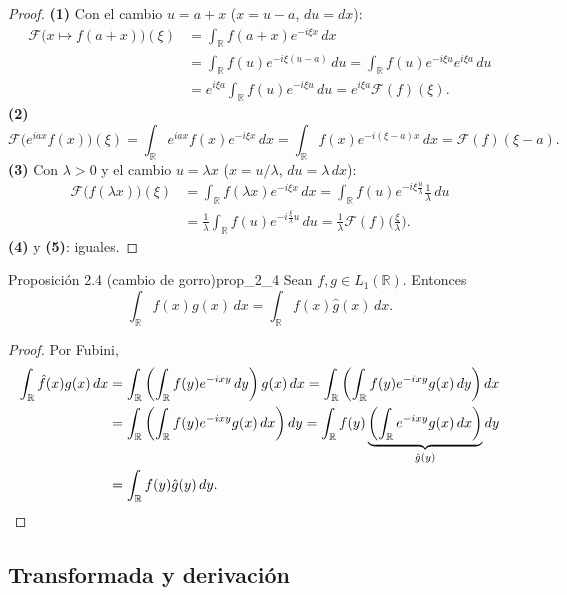 \begin{proof}
\textbf{(1)} Con el cambio $u = a + x$ ($x = u - a$, $du = dx$):
\begin{align*}
\mathcal{F}\big(x \mapsto f(a+x)\big)(\xi) &= \int_{\mathbb{R}}f(a+x)e^{-i\xi x}\,dx \\
&= \int_{\mathbb{R}}f(u)e^{-i\xi(u-a)}\,du = \int_{\mathbb{R}}f(u)e^{-i\xi u}e^{i\xi a}\,du \\
&= e^{i\xi a}\int_{\mathbb{R}}f(u)e^{-i\xi u}\,du = e^{i\xi a}\mathcal{F}(f)(\xi).
\end{align*}
\textbf{(2)}
\[
\mathcal{F}\big(e^{iax}f(x)\big)(\xi) = \int_{\mathbb{R}}e^{iax}f(x)e^{-i\xi x}\,dx = \int_{\mathbb{R}}f(x)e^{-i(\xi-a)x}\,dx = \mathcal{F}(f)(\xi - a).
\]
\textbf{(3)} Con $\lambda > 0$ y el cambio $u = \lambda x$ ($x = u/\lambda$, $du = \lambda\,dx$):
\begin{align*}
\mathcal{F}\big(f(\lambda x)\big)(\xi) &= \int_{\mathbb{R}}f(\lambda x)e^{-i\xi x}\,dx = \int_{\mathbb{R}}f(u)e^{-i\xi\frac{u}{\lambda}}\frac{1}{\lambda}\,du \\
&= \frac{1}{\lambda}\int_{\mathbb{R}}f(u)e^{-i\frac{\xi}{\lambda}u}\,du = \frac{1}{\lambda}\mathcal{F}(f)\Big(\frac{\xi}{\lambda}\Big).
\end{align*}
\textbf{(4)} y \textbf{(5)}: iguales.
\end{proof}

\begin{proposicion}{Proposición 2.4 (cambio de gorro)}{prop_2_4}
Sean $f, g \in L_1(\mathbb{R})$. Entonces
\[
\int_{\mathbb{R}}\hat{f}(x)g(x)\,dx = \int_{\mathbb{R}}f(x)\hat{g}(x)\,dx.
\]
\end{proposicion}

\begin{proof}
Por Fubini,
\begin{align*}
\int_{\mathbb{R}}\hat{f}(x)g(x)\,dx &= \int_{\mathbb{R}}\left(\int_{\mathbb{R}}f(y)e^{-ixy}\,dy\right)g(x)\,dx = \int_{\mathbb{R}}\left(\int_{\mathbb{R}}f(y)e^{-ixy}g(x)\,dy\right)dx \\
&= \int_{\mathbb{R}}\left(\int_{\mathbb{R}}f(y)e^{-ixy}g(x)\,dx\right)dy = \int_{\mathbb{R}}f(y)\underbrace{\left(\int_{\mathbb{R}}e^{-ixy}g(x)\,dx\right)}_{\hat{g}(y)}dy \\
&= \int_{\mathbb{R}}f(y)\hat{g}(y)\,dy. \qedhere
\end{align*}
\end{proof}

\subsection{Transformada y derivación}

